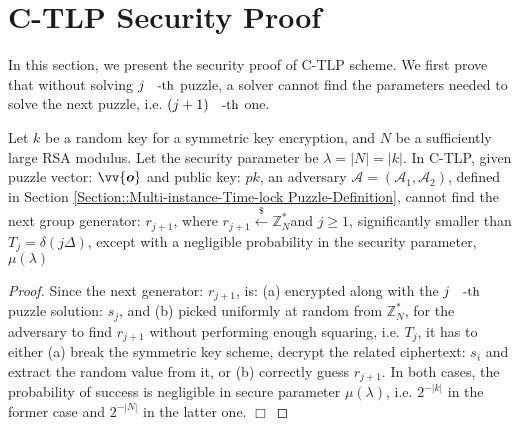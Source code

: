 
\section{C-TLP Security Proof}\label{CR-TLP-Proof}
 
In this section, we present   the security proof of C-TLP scheme. We first prove that without solving $j\text{\small{-th}}$ puzzle, a solver cannot find the parameters  needed to solve the next puzzle, i.e. $(j+1)\text{\small{-th}}$   one. 

 
  \begin{lemma}\label{lemma::Next-Generator-Privacy}  Let $k$ be a random key for a symmetric key encryption, and  $N$ be a  sufficiently large RSA modulus. Let  the security parameter be $\lambda=|N|=|k|$.  In C-TLP, given puzzle vector: $\vv{\bm{o}}$ and public key: $pk$, an adversary $\mathcal{A}=(\mathcal{A}_{\scriptscriptstyle 1},\mathcal{A}_{\scriptscriptstyle 2})$, defined in Section \ref{Section::Multi-instance-Time-lock Puzzle-Definition},  cannot find the next group generator: 
$r_{\scriptscriptstyle j+1}$, where $r_{\scriptscriptstyle j+1} \stackrel{\scriptscriptstyle\$}\leftarrow \mathbb{Z}^{\scriptscriptstyle *}_{\scriptscriptstyle N}$and $j\geq1$, significantly smaller than   $T_{\scriptscriptstyle j}=\delta(j\Delta)$, except with a negligible probability in the security parameter, $\mu(\lambda)$ 
  \end{lemma}
 \begin{proof}
Since the next generator: $r_{\scriptscriptstyle j+1}$, is: (a) encrypted along with the $j\text{\small{-th}}$ puzzle solution: $s_{\scriptscriptstyle j}$, and (b)  picked uniformly at random from $\mathbb{Z}^{\scriptscriptstyle *}_{\scriptscriptstyle N}$, for the adversary to find $r_{\scriptscriptstyle j+1}$ without performing enough squaring, i.e. $T_{\scriptscriptstyle j}$, it has to either (a) break the symmetric key scheme, decrypt the related ciphertext: $s_{\scriptscriptstyle i}$ and extract the random value from it, or (b) correctly guess $r_{\scriptscriptstyle j+1}$. In both cases, the probability of success is negligible in secure parameter $\mu(\lambda)$,  i.e. $2^{\scriptscriptstyle -|k|}$ in the former case and $2^{\scriptscriptstyle -|N|}$ in the latter one.  
 \hfill\(\Box\)
  \end{proof} 
  
